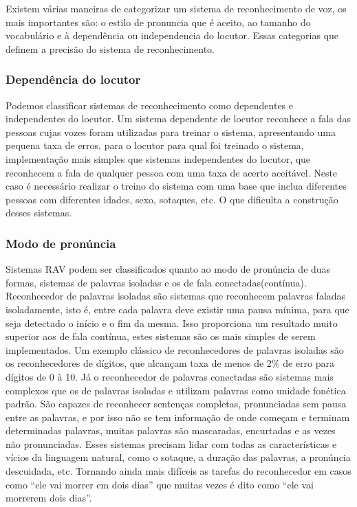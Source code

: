 Existem várias maneiras de categorizar um sistema de reconhecimento de voz, os mais importantes são: o estilo de pronuncia que é aceito, ao tamanho do vocabulário e à dependência ou independencia do locutor. \cite{Carac1} Essas categorias que definem a precisão do sistema de reconhecimento.

\subsubsection{Dependência do locutor}
Podemos classificar sistemas de reconhecimento como dependentes e independentes do locutor. Um sistema dependente de locutor reconhece a fala das pessoas cujas vozes foram utilizadas para treinar o sistema, apresentando uma pequena taxa de erros, para o locutor para qual foi treinado o sistema,  implementação mais simples que sistemas independentes do locutor, que reconhecem a fala de qualquer pessoa com uma taxa de acerto aceitável. Neste caso é necessário realizar o treino do sistema com uma base que inclua diferentes pessoas com diferentes idades, sexo, sotaques, etc. O que dificulta a construção desses sistemas.

\subsubsection{Modo de pronúncia}
Sistemas RAV podem ser classificados quanto ao modo de pronúncia de duas formas, sistemas de palavras isoladas e os de fala conectadas(contínua). Reconhecedor de palavras isoladas são sistemas que reconhecem palavras faladas isoladamente, isto é, entre cada palavra deve existir uma pausa mínima, para que seja detectado o início e o fim da mesma. Isso proporciona um resultado muito superior aos de fala contínua, estes sistemas são os mais simples de serem implementados. Um exemplo clássico de reconhecedores de palavras isoladas são os reconhecedores de dígitos, que alcançam taxa de menos de 2{\%} de erro para dígitos de 0 à 10.\cite{RavPtBr}
Já o reconhecedor de palavras conectadas são sistemas mais complexos que os de palavras isoladas e utilizam palavras como unidade fonética padrão. São capazes de reconhecer sentenças completas, pronunciadas sem pausa entre as palavras, e por isso não se tem informação de onde começam e terminam determinadas palavras, muitas palavras são mascaradas, encurtadas e as vezes não pronunciadas. Esses sistemas precisam lidar com todas as características e vícios da linguagem natural, como o sotaque, a duração das palavras, a pronúncia descuidada, etc. Tornando ainda mais difíceis as tarefas do reconhecedor em casos como “ele vai morrer em dois dias” que 
muitas vezes  é dito como “ele vai morrerem dois dias”.\cite{RavPtBr}

